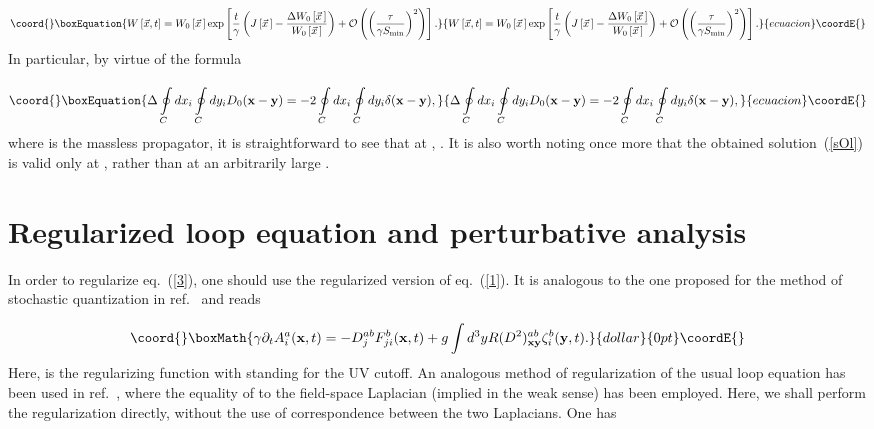 \documentclass[a4paper,12pt]{article}
\begin{document}
\begin{equation}\coord{}\boxEquation{
\label{sOl}
W\left[\vec x,t\right]=W_0\left[\vec x{\,}\right]\exp\left[\frac{t}{\gamma}\left(J\left[\vec x{\,}\right]-
\frac{\Delta W_0\left[{\vec x}{\,}\right]}{W_0\left[{\vec x}{\,}\right]}\right)+
{\cal O}\left(\left(\frac{\tau}{\gamma S_{\rm min}}\right)^2\right)\right].
}{
W\left[\vec x,t\right]=W_0\left[\vec x{\,}\right]\exp\left[\frac{t}{\gamma}\left(J\left[\vec x{\,}\right]-
\frac{\Delta W_0\left[{\vec x}{\,}\right]}{W_0\left[{\vec x}{\,}\right]}\right)+
{\cal O}\left(\left(\frac{\tau}{\gamma S_{\rm min}}\right)^2\right)\right].
}{ecuacion}\coordE{}\end{equation}
In particular, by virtue of the formula~\cite{le, rev}

\begin{equation}\coord{}\boxEquation{
\label{D0}
\Delta\oint\limits_{C}^{}dx_i\oint\limits_{C}^{}dy_iD_0({\bf x}-{\bf y})=
-2\oint\limits_{C}^{}dx_i\oint\limits_{C}^{}dy_i\delta({\bf x}-{\bf y}),
}{
\Delta\oint\limits_{C}^{}dx_i\oint\limits_{C}^{}dy_iD_0({\bf x}-{\bf y})=
-2\oint\limits_{C}^{}dx_i\oint\limits_{C}^{}dy_i\delta({\bf x}-{\bf y}),
}{ecuacion}\coordE{}\end{equation}
where \coordHE{} is the
massless propagator,
it is straightforward to see that at \coordHE{},
\coordHE{}. It is also worth noting once more
that the obtained solution~(\ref{sOl}) is valid only at \coordHE{}, rather than at an arbitrarily large \coordHE{}.


\section{Regularized loop equation and perturbative analysis}
In order to regularize eq.~(\ref{3}), one should use the regularized version of eq.~(\ref{1}). It is analogous to the one proposed for
the method of stochastic quantization in ref.~\cite{bhst} and reads

$$\coord{}\boxMath{\gamma\partial_t A_i^a({\bf x},t)=-D_j^{ab}F_{ji}^b({\bf x},t)+g\int d^3yR(D^2)_{\bf xy}^{ab}\zeta_i^b({\bf y},t).}{dollar}{0pt}\coordE{}$$
Here,
\coordHE{}
is the regularizing function with \myHighlight{$\Lambda$}\coordHE{} standing for the UV cutoff. An analogous method of regularization of the usual
loop equation has been used in ref.~\cite{mh}, where the equality of \myHighlight{$-\Delta$}\coordHE{} to the field-space Laplacian
(implied in the weak sense) has been employed. Here, we shall perform the regularization directly, without
the use of correspondence between the two Laplacians. One has
\end{document}
